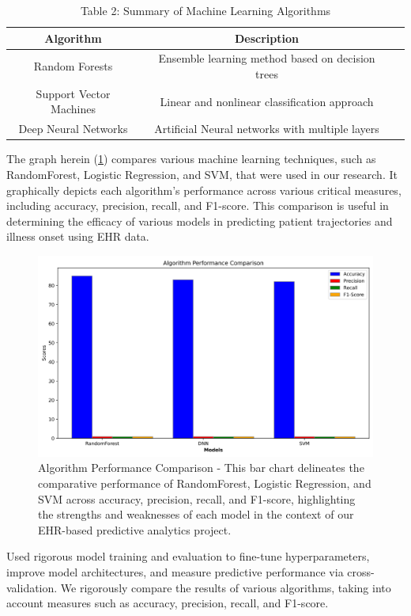 \documentclass[manuscript,screen,]{acmart}
\begin{document}
\begin{table}[h]
    \centering
    \begin{tabular}{|c|c|c|}
    \hline
    Algorithm & Description\\
    \hline
    Random Forests & Ensemble learning method based on decision trees\\
    \hline
    Support Vector Machines & Linear and nonlinear classification approach\\
    \hline
    Deep Neural Networks & Artificial Neural networks with multiple layers\\
    \hline
    \end{tabular}
    \caption{Table 2: Summary of Machine Learning Algorithms}
    \label{tab: Summary of Machine Learning Algorithms}
    
\end{table}
The graph herein (\ref{fig: Algorithm Performance Comparison}) compares various machine learning techniques, such as RandomForest, Logistic Regression, and SVM, that were used in our research. It graphically depicts each algorithm's performance across various critical measures, including accuracy, precision, recall, and F1-score. This comparison is useful in determining the efficacy of various models in predicting patient trajectories and illness onset using EHR data.

\begin{figure}
    \centering
    \includegraphics[width=0.5\linewidth]{Images//Sections/Algorithm Performance Comparison.png}
    \caption{Algorithm Performance Comparison - This bar chart delineates the comparative performance of RandomForest, Logistic Regression, and SVM across accuracy, precision, recall, and F1-score, highlighting the strengths and weaknesses of each model in the context of our EHR-based predictive analytics project.}
    \label{fig: Algorithm Performance Comparison}
\end{figure}

Used rigorous model training and evaluation to fine-tune hyperparameters, improve model architectures, and measure predictive performance via cross-validation. We rigorously compare the results of various algorithms, taking into account measures such as accuracy, precision, recall, and F1-score.
\end{document}

